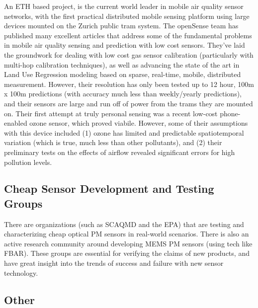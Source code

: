 An ETH based project, is the current world leader in mobile air quality sensor networks, with the first practical distributed mobile sensing platform using large devices mounted on the Zurich public tram system. The openSense team has published many excellent articles that address some of the fundamental problems in mobile air quality sensing and prediction with low cost sensors.  They've laid the groundwork for dealing with low cost gas sensor calibration (particularly with multi-hop calibration techniques), as well as advancing the state of the art in Land Use Regression modeling based on sparse, real-time, mobile, distributed measurement.  However, their resolution has only been tested up to 12 hour, 100m x 100m predictions (with accuracy much less than weekly/yearly predictions), and their sensors are large and run off of power from the trams they are mounted on. Their first attempt at truly personal sensing was a recent low-cost phone-enabled ozone sensor, which proved viabile.  However, some of their assumptions with this device included (1) ozone has limited and predictable spatiotemporal variation (which is true, much less than other pollutants), and (2) their preliminary tests on the effects of airflow revealed significant errors for high pollution levels.
	
\subsection{Cheap Sensor Development and Testing Groups}

There are organizations (such as SCAQMD and the EPA) that are testing and characterizing cheap optical PM sensors in real-world scenarios. There is also an active research community around developing MEMS PM sensors (using tech like FBAR).  These groups are essential for verifying the claims of new products, and have great insight into the trends of success and failure with new sensor technology.

\subsection{Other}

